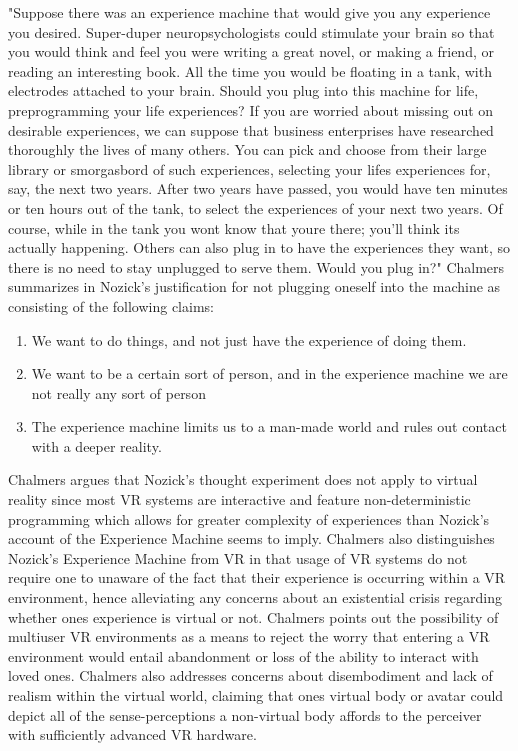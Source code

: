 "Suppose there was an experience machine that would give you any experience you desired.
Super-duper neuropsychologists could stimulate your brain so that you would think and feel you
were writing a great novel, or making a friend, or reading an interesting book. All the time you
would be floating in a tank, with electrodes attached to your brain. Should you plug into this
machine for life, preprogramming your life experiences? If you are worried about missing out on desirable experiences, we can suppose that business enterprises have researched thoroughly
the lives of many others. You can pick and choose from their large library or smorgasbord of
such experiences, selecting your lifes experiences for, say, the next two years. After two years
have passed, you would have ten minutes or ten hours out of the tank, to select the experiences of
your next two years. Of course, while in the tank you wont know that youre there; you'll think its
actually happening. Others can also plug in to have the experiences they want, so there is no need
to stay unplugged to serve them. Would you plug in?" \cite{nozick2013anarchy}
\newline Chalmers summarizes in \cite{ChalmersVR} Nozick's justification for not plugging oneself into the machine as consisting of the following claims:
\begin{enumerate}
	\item We want to do
things, and not just have the experience of doing them.
\item We want to be a certain sort of
person, and in the experience machine we are not really any sort of person
\item The experience
machine limits us to a man-made world and rules out contact with a deeper reality.
\end{enumerate}
Chalmers argues that Nozick's thought experiment does not apply to virtual reality since most VR systems are interactive and feature non-deterministic programming which allows for greater complexity of experiences than Nozick's account of the Experience Machine seems to imply. Chalmers also distinguishes Nozick's Experience Machine from VR in that usage of VR systems do not require one to unaware of the fact that their experience is occurring within a VR environment, hence alleviating any concerns about an existential crisis regarding whether ones experience is virtual or not. Chalmers points out the possibility of multiuser VR environments as a means to reject the worry that entering a VR environment would entail abandonment or loss of the ability to interact with loved ones. \cite{ChalmersVR} Chalmers also addresses concerns about disembodiment and lack of realism within the virtual world, claiming that ones virtual body or avatar could depict all of the sense-perceptions a non-virtual body affords to the perceiver with sufficiently advanced VR hardware. 

